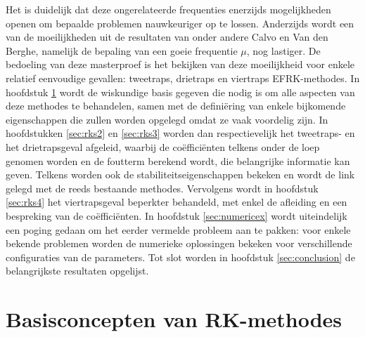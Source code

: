 \documentclass[12pt]{article}
\begin{document}
Het is duidelijk dat deze ongerelateerde frequenties enerzijds mogelijkheden openen om bepaalde problemen nauwkeuriger op te lossen. Anderzijds wordt een van de moeilijkheden uit de resultaten van onder andere Calvo en Van den Berghe, namelijk de bepaling van een goeie frequentie \(\mu\), nog lastiger. De bedoeling van deze masterproef is het bekijken van deze moeilijkheid voor enkele relatief eenvoudige gevallen: tweetraps, drietraps en viertraps EFRK-methodes. In hoofdstuk \ref{sec:mathintro} wordt de wiskundige basis gegeven die nodig is om alle aspecten van deze methodes te behandelen, samen met de definiëring van enkele bijkomende eigenschappen die zullen worden opgelegd omdat ze vaak voordelig zijn. In hoofdstukken \ref{sec:rks2} en \ref{sec:rks3} worden dan respectievelijk het tweetraps- en het drietrapsgeval afgeleid, waarbij de coëfficiënten telkens onder de loep genomen worden en de foutterm berekend wordt, die belangrijke informatie kan geven. Telkens worden ook de stabiliteitseigenschappen bekeken en wordt de link gelegd met de reeds bestaande methodes. Vervolgens wordt in hoofdstuk \ref{sec:rks4} het viertrapsgeval beperkter behandeld, met enkel de afleiding en een bespreking van de coëfficiënten. In hoofdstuk \ref{sec:numericex} wordt uiteindelijk een poging gedaan om het eerder vermelde probleem aan te pakken: voor enkele bekende problemen worden de numerieke oplossingen bekeken voor verschillende configuraties van de parameters. Tot slot worden in hoofdstuk \ref{sec:conclusion} de belangrijkste resultaten opgelijst.

\newpage
\section{Basisconcepten van RK-methodes} \label{sec:mathintro}
\end{document}
